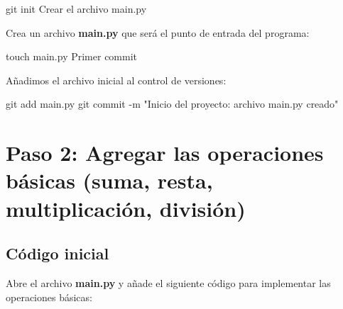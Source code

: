 \documentclass[
  a4paper,
  DIV=11,
  numbers=noendperiod,
  onepage,
  openany]{scrreprt}
\newenvironment{Shaded}{\begin{snugshade}}{\end{snugshade}}
\newcommand{\AttributeTok}[1]{\textcolor[rgb]{0.40,0.45,0.13}{#1}}
\newcommand{\ExtensionTok}[1]{\textcolor[rgb]{0.00,0.23,0.31}{#1}}
\newcommand{\FunctionTok}[1]{\textcolor[rgb]{0.28,0.35,0.67}{#1}}
\newcommand{\NormalTok}[1]{\textcolor[rgb]{0.00,0.23,0.31}{#1}}
\newcommand{\StringTok}[1]{\textcolor[rgb]{0.13,0.47,0.30}{#1}}
\begin{document}
\begin{Shaded}
\begin{Highlighting}[]
\FunctionTok{git}\NormalTok{ init}
\ExtensionTok{Crear}\NormalTok{ el archivo main.py}
\end{Highlighting}
\end{Shaded}

Crea un archivo \textbf{main.py} que será el punto de entrada del
programa:

\begin{Shaded}
\begin{Highlighting}[]
\FunctionTok{touch}\NormalTok{ main.py}
\ExtensionTok{Primer}\NormalTok{ commit}
\end{Highlighting}
\end{Shaded}

Añadimos el archivo inicial al control de versiones:

\begin{Shaded}
\begin{Highlighting}[]
\FunctionTok{git}\NormalTok{ add main.py}
\FunctionTok{git}\NormalTok{ commit }\AttributeTok{{-}m} \StringTok{"Inicio del proyecto: archivo main.py creado"}
\end{Highlighting}
\end{Shaded}

\section{Paso 2: Agregar las operaciones básicas (suma, resta,
multiplicación,
división)}\label{paso-2-agregar-las-operaciones-buxe1sicas-suma-resta-multiplicaciuxf3n-divisiuxf3n}

\subsection{Código inicial}\label{cuxf3digo-inicial}

Abre el archivo \textbf{main.py} y añade el siguiente código para
implementar las operaciones básicas:
\end{document}
